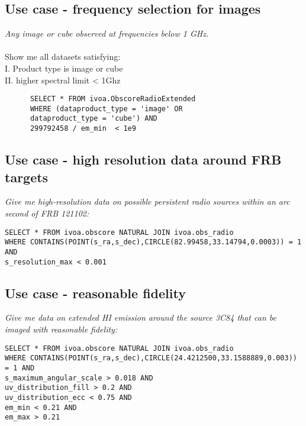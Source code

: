 \subsection{Use case - frequency selection  for images }
\textit{Any image or cube observed at frequencies below 1 GHz.}\\ \\
Show me all datasets satisfying:\\
I. Product type is image or cube \\
II. higher spectral limit < 1Ghz
\begin{verbatim}
      SELECT * FROM ivoa.ObscoreRadioExtended
      WHERE (dataproduct_type = 'image' OR
      dataproduct_type = 'cube') AND
      299792458 / em_min  < 1e9
\end{verbatim}


 


\subsection{Use case - high resolution data around FRB targets }

\textit{Give me high-resolution data on possible persistent radio sources within an arc second of FRB 121102:}

\begin{verbatim}
SELECT * FROM ivoa.obscore NATURAL JOIN ivoa.obs_radio
WHERE CONTAINS(POINT(s_ra,s_dec),CIRCLE(82.99458,33.14794,0.0003)) = 1 AND
s_resolution_max < 0.001
\end{verbatim}

\subsection{Use case - reasonable fidelity}

\textit{Give me data on extended HI emission around the source 3C84 that can
be imaged with reasonable fidelity:}

\begin{verbatim}
SELECT * FROM ivoa.obscore NATURAL JOIN ivoa.obs_radio
WHERE CONTAINS(POINT(s_ra,s_dec),CIRCLE(24.4212500,33.1588889,0.003)) = 1 AND
s_maximum_angular_scale > 0.018 AND
uv_distribution_fill > 0.2 AND
uv_distribution_ecc < 0.75 AND
em_min < 0.21 AND
em_max > 0.21
\end{verbatim}

